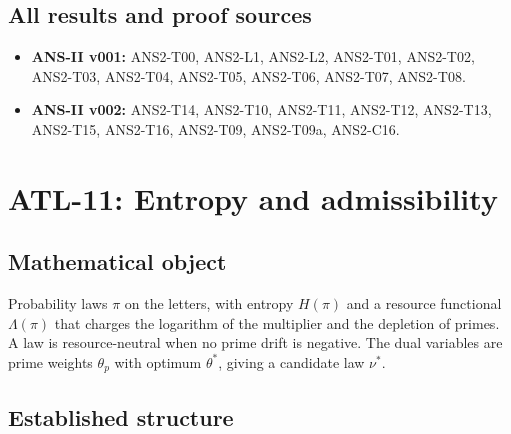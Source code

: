 \documentclass[
  11pt,
]{article}
\providecommand{\tightlist}{%
  \setlength{\itemsep}{0pt}\setlength{\parskip}{0pt}}
\begin{document}
\hypertarget{all-results-and-proof-sources-9}{%
\subsection{All results and proof
sources}\label{all-results-and-proof-sources-9}}

\begin{itemize}
\tightlist
\item
  \textbf{ANS-II v001:} ANS2-T00, ANS2-L1, ANS2-L2, ANS2-T01, ANS2-T02,
  ANS2-T03, ANS2-T04, ANS2-T05, ANS2-T06, ANS2-T07, ANS2-T08.
\item
  \textbf{ANS-II v002:} ANS2-T14, ANS2-T10, ANS2-T11, ANS2-T12,
  ANS2-T13, ANS2-T15, ANS2-T16, ANS2-T09, ANS2-T09a, ANS2-C16.
\end{itemize}

\hypertarget{atl-11-entropy-and-admissibility}{%
\section{ATL-11: Entropy and
admissibility}\label{atl-11-entropy-and-admissibility}}

\hypertarget{mathematical-object-10}{%
\subsection{Mathematical object}\label{mathematical-object-10}}

Probability laws \(\pi\) on the letters, with entropy \(H(\pi)\) and a
resource functional \(\Lambda(\pi)\) that charges the logarithm of the
multiplier and the depletion of primes. A law is resource-neutral when
no prime drift is negative. The dual variables are prime weights
\(\theta_p\) with optimum \(\theta^\ast\), giving a candidate law
\(\nu^\ast\).

\hypertarget{established-structure-9}{%
\subsection{Established structure}\label{established-structure-9}}
\end{document}
